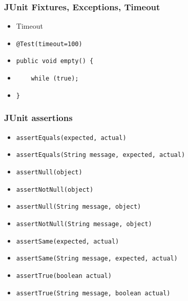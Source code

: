 \documentclass[10pt,xcolor=pdflatex]{beamer}
\begin{document}
\begin{frame}[containsverbatim]\frametitle{JUnit Fixtures, Exceptions, Timeout}
\begin{itemize}
	\item Timeout
	\item[] \verb+@Test(timeout=100)+
    \item[] \verb+public void empty() {+
    \item[] \verb+    while (true);+
    \item[] \verb+}+
\end{itemize}
\end{frame}


\begin{frame}\frametitle{JUnit assertions}
\begin{itemize}
	\item \texttt{assertEquals(expected, actual)}
	\item \texttt{assertEquals(String message, expected, actual)}
	\item \texttt{assertNull(object)}
	\item \texttt{assertNotNull(object)}
	\item \texttt{assertNull(String message, object)}
	\item \texttt{assertNotNull(String message, object)}
	\item \texttt{assertSame(expected, actual)}
	\item \texttt{assertSame(String message, expected, actual)}
	\item \texttt{assertTrue(boolean actual)}
	\item \texttt{assertTrue(String message, boolean actual)}
\end{itemize}
\end{frame}
\end{document}

